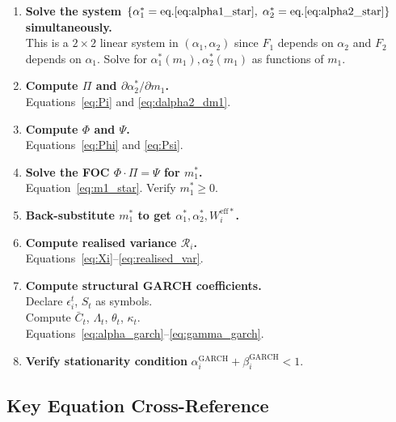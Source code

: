 \documentclass[12pt,a4paper]{article}
\newcommand{\1}{\mathbf{1}}
\begin{document}
\begin{enumerate}[label=\textbf{Step \arabic*.}, leftmargin=*, labelwidth=*, align=left]
  \item \textbf{Solve the system $\{\alpha_1^* = \text{eq.}\eqref{eq:alpha1_star},\; \alpha_2^* = \text{eq.}\eqref{eq:alpha2_star}\}$ simultaneously.}\\
  This is a $2\times2$ linear system in $(\alpha_1, \alpha_2)$ since $F_1$ depends on $\alpha_2$ and $F_2$ depends on $\alpha_1$. Solve for $\alpha_1^*(m_1), \alpha_2^*(m_1)$ as functions of $m_1$.

  \item \textbf{Compute $\Pi$ and $\partial\alpha_2^*/\partial m_1$.}\\
  Equations~\eqref{eq:Pi} and \eqref{eq:dalpha2_dm1}.

  \item \textbf{Compute $\Phi$ and $\Psi$.}\\
  Equations~\eqref{eq:Phi} and \eqref{eq:Psi}.

  \item \textbf{Solve the FOC $\Phi \cdot \Pi = \Psi$ for $m_1^*$.}\\
  Equation~\eqref{eq:m1_star}. Verify $m_1^* \geq 0$.

  \item \textbf{Back-substitute $m_1^*$ to get $\alpha_1^*, \alpha_2^*, W_i^{\mathrm{eff}*}$.}

  \item \textbf{Compute realised variance $\mathcal{R}_i$.}\\
  Equations~\eqref{eq:Xi}--\eqref{eq:realised_var}.

  \item \textbf{Compute structural GARCH coefficients.}\\
  Declare $\epsilon_i^t$, $S_t$ as symbols.\\
  Compute $\bar{C}_t$, $\Lambda_t$, $\theta_t$, $\kappa_t$.\\
  Equations~\eqref{eq:alpha_garch}--\eqref{eq:gamma_garch}.

  \item \textbf{Verify stationarity condition} $\alpha_i^{\mathrm{GARCH}} + \beta_i^{\mathrm{GARCH}} < 1$.

\end{enumerate}

\subsection{Key Equation Cross-Reference}
\end{document}
